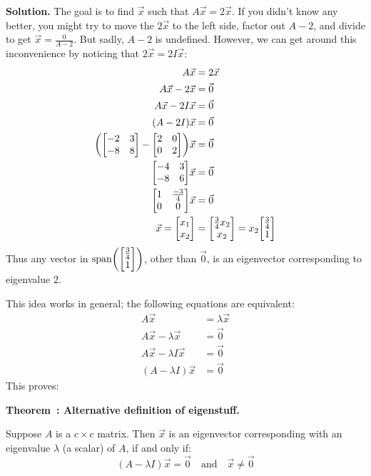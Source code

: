 \documentclass[11pt, letterpaper]{report}
\newenvironment{book}{}{}
\let\originalleft\left
\let\originalright\right
\renewcommand{\left}{\mathopen{}\mathclose\bgroup\originalleft}
\renewcommand{\right}{\aftergroup\egroup\originalright}
\newcounter{theorem}[chapter]
\newenvironment{theorem}[1][]{\refstepcounter{theorem}\begin{bbox}\par
    \noindent\textbf{Theorem~\thetheorem: #1}}{\end{bbox}}
\newlength\oldfboxsep%
\newlength\myminiwidth%
\newenvironment{bbox}{%
  \setlength\oldfboxsep\fboxsep
  \setlength{\fboxsep}{.1in}%
  \setlength\myminiwidth\linewidth%
  \addtolength\myminiwidth{-0.2in}%
  \vspace{0.1in}%
  \begin{lrbox}{\bboxbox}\begin{minipage}{\myminiwidth}%
    }{%
    \end{minipage}\end{lrbox}%
  \noindent\fbox{\usebox{\bboxbox}}\vspace{0.1in}\setlength\fboxsep\oldfboxsep%
}
\DeclareMathOperator{\spn}{span}
\newcommand{\bbvec}[2]{
  \begin{bmatrix} #1 \\ #2 \end{bmatrix}
}
\begin{document}
\begin{book}
\textbf{Solution.} The goal is to find $\vec{x}$ such that $A\vec{x} = 2\vec{x}$. If you didn't know any better, you might try to move the $2\vec{x}$ to the left side, factor out $A-2$, and divide to get $\vec{x}=\frac{0}{A-2}$. But sadly, $A-2$ is undefined. However, we can get around this inconvenience by noticing that $2\vec{x} = 2I\vec{x}$:
\begin{align*}
A\vec{x}&=2\vec{x} \\
A \vec{x}-2\vec{x}&=\vec{0} \\
A \vec{x}-2I\vec{x}&=\vec{0} \\
( A-2I )\vec{x}&=\vec{0}\\
\left( \begin{bmatrix}
-2 & 3 \\
-8 & 8
\end{bmatrix} - \begin{bmatrix}
2 & 0 \\
0 & 2 
\end{bmatrix} \right)\vec{x}&= \vec{0} \\
\begin{bmatrix}
-4 & 3 \\
-8 & 6 
\end{bmatrix}\vec{x} &= \vec{0} \\
\begin{bmatrix}
1 & \frac{-3}{4} \\
0 & 0 
\end{bmatrix}\vec{x}&=\vec{0}\\
\vec{x}= \bbvec{x_1}{x_2} &= \bbvec{\frac{3}{4}x_2}{x_{2}}  = x_2 \bbvec{\frac{3}{4}}{1}
\end{align*}
Thus any vector in $\spn \left( \bbvec{\frac{3}{4}}{1} \right)$, other than $\vec{0}$, is an eigenvector corresponding to eigenvalue $2$.\blacksquare
\end{book}


This idea works in general; the following equations are equivalent:
\begin{align*}
A\vec{x}&=\lambda \vec{x} \\
A \vec{x}- \lambda \vec{x} &= \vec{0}\\
A \vec{x} - \lambda I \vec{x} &= \vec{0}\\
( A-\lambda I ) \vec{x}&= \vec{0}
\end{align*}
This proves:

\begin{theorem}[Alternative definition of eigenstuff.]  
\label{theorem:alt-defn-eigenstuff}

Suppose $A$ is a $c\times c$ matrix. Then $\vec{x}$ is an eigenvector corresponding with an eigenvalue $\lambda$ (a scalar) of $A$, if and only if:
\[( A-\lambda I )\vec{x}=\vec{0} \quad \text{and} \quad \vec{x}\ne\vec{0}\]
\end{theorem}
\end{document}
